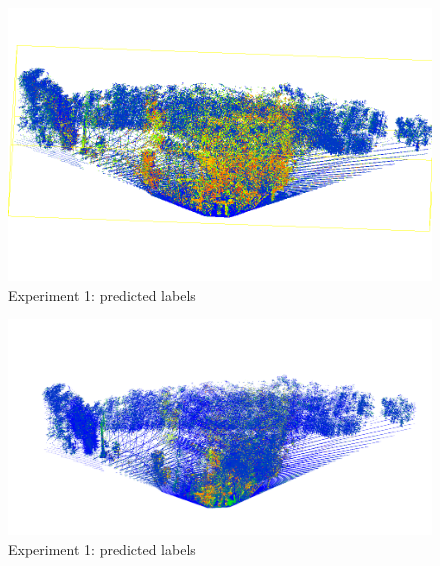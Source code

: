 \begin{figure}[H]
    \centering
	\includegraphics[scale=0.27]{sources/res1_pred.png}
	\caption{Experiment 1: predicted labels}
	\label{res1_pred}
\end{figure}

\begin{figure}[H]
    \centering
	\includegraphics[scale=0.27]{sources/res2_pred.png}
	\caption{Experiment 1: predicted labels}
	\label{res2_pred}
\end{figure}

